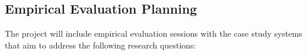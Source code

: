 %
%
%
%




\subsection{Empirical Evaluation Planning}
\label{sec:codemutation:evaluation}

\STARTCHANGEDNOV

The project will include empirical evaluation sessions with the case study systems that aim to address the following research questions:


